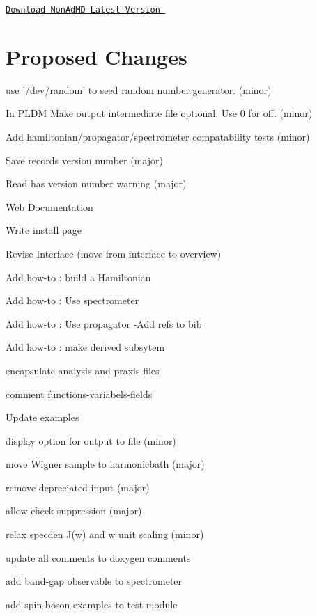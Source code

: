 \href{../../share/nonadmd-0.1.44-alpha.tar.gz}{\tt Download Non\+Ad\+M\+D Latest Version }\hypertarget{_tags_Wishlist}{}\section{Proposed Changes}\label{_tags_Wishlist}

\begin{DoxyItemize}
\item use '/dev/random' to seed random number generator. (minor)
\item In P\+L\+D\+M Make output intermediate file optional. Use 0 for off. (minor)
\item Add hamiltonian/propagator/spectrometer compatability tests (minor)
\item Save records version number (major)
\item Read has version number warning (major)
\item Web Documentation
\begin{DoxyItemize}
\item Write install page
\item Revise Interface (move from interface to overview)
\begin{DoxyItemize}
\item Add how-\/to \+: build a Hamiltonian
\item Add how-\/to \+: Use spectrometer
\item Add how-\/to \+: Use propagator -\/\+Add refs to bib
\end{DoxyItemize}
\item Add how-\/to \+: make derived subsytem
\item encapsulate analysis and praxis files
\item comment functions-\/variabels-\/fields
\end{DoxyItemize}
\item Update examples
\item display option for output to file (minor)
\item move Wigner sample to harmonicbath (major)
\item remove depreciated input (major)
\item allow check suppression (major)
\item relax specden J(w) and w unit scaling (minor)
\item update all comments to doxygen comments
\item add band-\/gap observable to spectrometer
\item add spin-\/boson examples to test module

\end{DoxyItemize}
